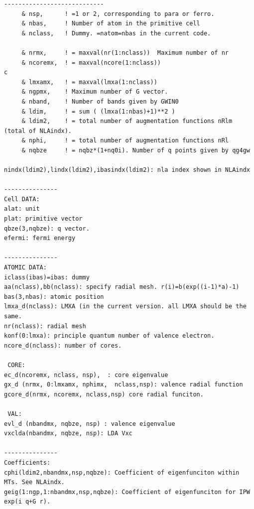 \documentclass[a4paper,10pt,epsf,fleqn]{article}
\begin{document}
\begin{verbatim}
----------------------------
     & nsp,      ! =1 or 2, corresponding to para or ferro.
     & nbas,     ! Number of atom in the primitive cell
     & nclass,   ! Dummy. =natom=nbas in the current code.
                         
     & nrmx,     ! = maxval(nr(1:nclass))  Maximum number of nr
     & ncoremx,  ! = maxval(ncore(1:nclass))
c
     & lmxamx,   ! = maxval(lmxa(1:nclass))
     & ngpmx,    ! Maximum number of G vector.
     & nband,    ! Number of bands given by GWIN0
     & ldim,     ! = sum ( (lmxa(1:nbas)+1)**2 )
     & ldim2,    ! = total number of augmentation functions nRlm (total of NLAindx).
     & nphi,     ! = total number of augmentation functions nRl  
     & nqbze     ! = nqbz*(1+nq0i). Number of q points given by qg4gw

nindx(ldim2),lindx(ldim2),ibasindx(ldim2): nla index shown in NLAindx

---------------
Cell DATA:
alat: unit
plat: primitive vector
qbze(3,nqbze): q vector.
efermi: fermi energy

---------------
ATOMIC DATA:
iclass(ibas)=ibas: dummy
aa(nclass),bb(nclass): specify radial mesh. r(i)=b(exp((i-1)*a)-1)
bas(3,nbas): atomic position
lmxa_d(nclass): LMXA (in the current version. all LMXA should be the same.
nr(nclass): radial mesh
konf(0:lmxa): principle quantum number of valence electron.
ncore_d(nclass): number of cores.

 CORE:
ec_d(ncoremx, nclass, nsp),  : core eigenvalue
gx_d (nrmx, 0:lmxamx, nphimx,  nclass,nsp): valence radial function
gcore_d(nrmx, ncoremx, nclass,nsp) core radial funciton.

 VAL:
evl_d (nbandmx, nqbze, nsp) : valence eigenvalue
vxclda(nbandmx, nqbze, nsp): LDA Vxc

---------------
Coefficients:
cphi(ldim2,nbandmx,nsp,nqbze): Coefficient of eigenfunciton within MTs. See NLAindx.
geig(1:ngp,1:nbandmx,nsp,nqbze): Coefficient of eigenfunciton for IPW exp(i q+G r).




\end{verbatim}
\end{document}
